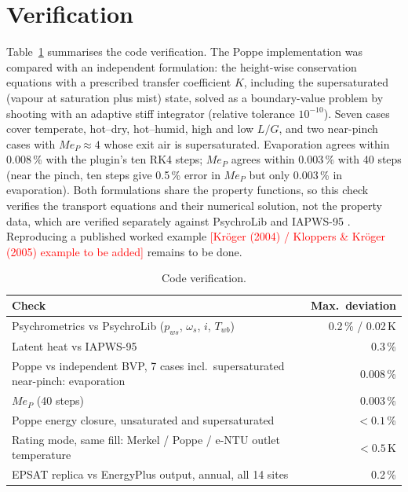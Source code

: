 \documentclass[preprint,12pt,authoryear]{elsarticle}
\newcommand{\tbd}[1]{\textcolor{red}{[#1]}}
\begin{document}
\section{Verification}\label{sec:verification}
Table~\ref{tab:verification} summarises the code verification. The Poppe implementation was compared with an independent
formulation: the height-wise conservation equations with a prescribed transfer coefficient $K$, including the
supersaturated (vapour at saturation plus mist) state, solved as a boundary-value problem by shooting with an adaptive
stiff integrator (relative tolerance $10^{-10}$). Seven cases cover temperate, hot--dry, hot--humid, high and low $L/G$,
and two near-pinch cases with $Me_P\approx4$ whose exit air is supersaturated. Evaporation agrees within 0.008\,\% with
the plugin's ten RK4 steps; $Me_P$ agrees within 0.003\,\% with 40 steps (near the pinch, ten steps give 0.5\,\% error in
$Me_P$ but only 0.003\,\% in evaporation). Both formulations share the property functions, so this check verifies the
transport equations and their numerical solution, not the property data, which are verified separately against
PsychroLib \citep{meyer2019psychrolib} and IAPWS-95 \citep{wagner2002iapws}. Reproducing a published worked example
\tbd{Kröger (2004) / Kloppers \& Kröger (2005) example to be added} remains to be done.

\begin{table}[t]\centering\small
\caption{Code verification.}\label{tab:verification}
\begin{tabular}{lr}\toprule
Check & Max.\ deviation \\\midrule
Psychrometrics vs PsychroLib ($p_{ws}$, $\omega_s$, $i$, $T_{wb}$) & 0.2\,\% / 0.02\,K \\
Latent heat vs IAPWS-95 & 0.3\,\% \\
Poppe vs independent BVP, 7 cases incl.\ supersaturated near-pinch: evaporation & 0.008\,\% \\
\hspace{1em} $Me_P$ (40 steps) & 0.003\,\% \\
Poppe energy closure, unsaturated and supersaturated & $<0.1$\,\% \\
Rating mode, same fill: Merkel / Poppe / e-NTU outlet temperature & $<0.5$\,K \\
EPSAT replica vs EnergyPlus output, annual, all 14 sites & 0.2\,\% \\\bottomrule
\end{tabular}
\end{table}
\end{document}

